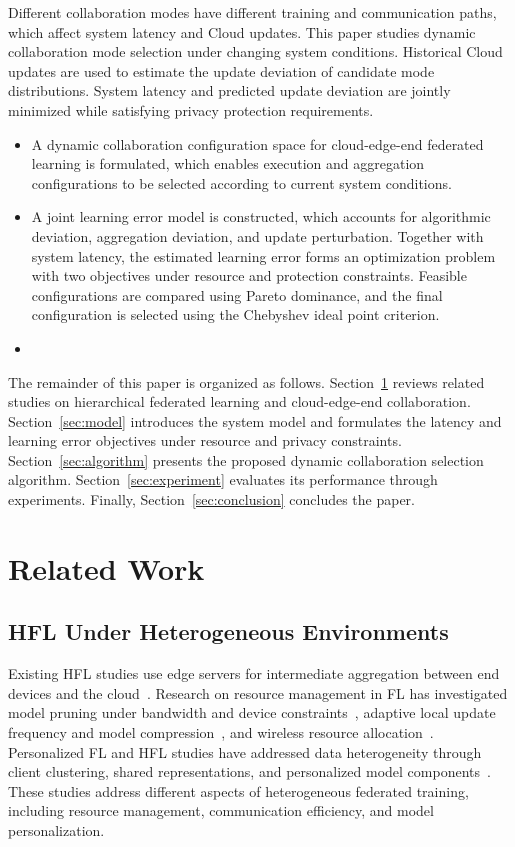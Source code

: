 \documentclass[5p,times]{elsarticle}
\theoremstyle{plain}
\theoremstyle{definition}
\theoremstyle{remark}
\begin{document}
Different collaboration modes have different
training and communication paths, which affect
system latency and Cloud updates. This paper
studies dynamic collaboration mode selection
under changing system conditions. Historical
Cloud updates are used to estimate the update
deviation of candidate mode distributions.
System latency and predicted update deviation
are jointly minimized while satisfying
privacy protection requirements.
\begin{itemize}
    \item A dynamic collaboration configuration space for cloud-edge-end federated learning is formulated, which enables execution and aggregation configurations to be selected according to current system conditions.

    \item A joint learning error model is constructed, which accounts for algorithmic deviation, aggregation deviation, and update perturbation. Together with system latency, the estimated learning error forms an optimization problem with two objectives under resource and protection constraints. Feasible configurations are compared using Pareto dominance, and the final configuration is selected using the Chebyshev ideal point criterion.

    \item
\end{itemize}

The remainder of this paper is organized as follows.
Section~\ref{sec:related_work} reviews related studies
on hierarchical federated learning and cloud-edge-end
collaboration.
Section~\ref{sec:model} introduces the system model
and formulates the latency and learning error objectives
under resource and privacy constraints.
Section~\ref{sec:algorithm} presents the proposed
dynamic collaboration selection algorithm.
Section~\ref{sec:experiment} evaluates its performance
through experiments.
Finally, Section~\ref{sec:conclusion} concludes the paper.

\section{Related Work}
\label{sec:related_work}
\subsection{HFL Under Heterogeneous Environments}
Existing HFL studies use edge servers for intermediate aggregation between end devices and the cloud~\cite{hfl}. Research on resource management in FL has investigated model pruning under bandwidth and device constraints~\cite{phfl}, adaptive local update frequency and model compression~\cite{xu2022adaptive,wang2019adaptivefl}, and wireless resource allocation~\cite{dinh2021wirelessfl}. Personalized FL and HFL studies have addressed data heterogeneity through client clustering, shared representations, and personalized model components~\cite{sattler2020clustered,collins2021exploiting,Personalizedhfl}. These studies address different aspects of heterogeneous federated training, including resource management, communication efficiency, and model personalization.
\end{document}
